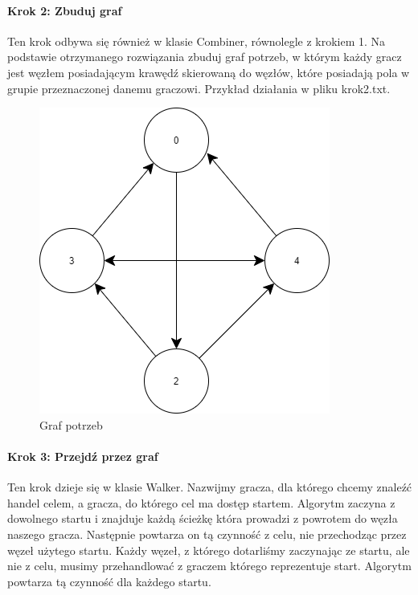 \documentclass{article}
\begin{document}
\paragraph{Krok 2: Zbuduj graf}
Ten krok odbywa się również w klasie Combiner, równolegle z krokiem 1. Na podstawie otrzymanego rozwiązania zbuduj graf potrzeb, w którym każdy gracz jest węzłem posiadającym krawędź skierowaną do węzłów, które posiadają pola w grupie przeznaczonej danemu graczowi.
Przykład działania w pliku krok2.txt.
\begin{figure}
	\includegraphics[width=\textwidth]{graf}
	\caption{Graf potrzeb}
\end{figure}
\paragraph{Krok 3: Przejdź przez graf}
Ten krok dzieje się w klasie Walker. Nazwijmy gracza, dla którego chcemy znaleźć handel celem, a gracza, do którego cel ma dostęp startem. Algorytm zaczyna z dowolnego startu i znajduje każdą ścieżkę która prowadzi z powrotem do węzła naszego gracza. Następnie powtarza on tą czynność z celu, nie przechodząc przez węzeł użytego startu. Każdy węzeł, z którego dotarliśmy zaczynając ze startu, ale nie z celu, musimy przehandlować z graczem którego reprezentuje start. Algorytm powtarza tą czynność dla każdego startu.
\end{document}
